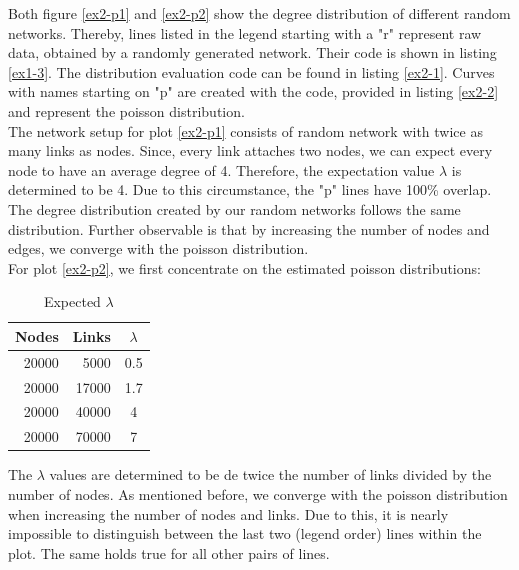 \documentclass[10pt,a4paper]{article}
\begin{document}
\begin{enumerate}
Both figure \ref{ex2-p1} and \ref{ex2-p2} show the degree distribution of different random networks. Thereby, lines listed in the legend starting with a {"}r{"} represent raw data, obtained by a randomly generated network. Their code is shown in listing \ref{ex1-3}. The distribution evaluation code can be found in listing \ref{ex2-1}. Curves with names starting on {"}p{"} are created with the code, provided in listing \ref{ex2-2} and represent the poisson distribution.\\
The network setup for plot \ref{ex2-p1} consists of random network with twice as many links as nodes. Since, every link attaches two nodes, we can expect every node to have an average degree of 4. Therefore, the expectation value $\lambda$ is determined to be 4. Due to this circumstance, the {"}p{"} lines have 100{\%} overlap. The degree distribution created by our random networks follows the same distribution. Further observable is that by increasing the number of nodes and edges, we converge with the poisson distribution.\\
For plot \ref{ex2-p2}, we first concentrate on the estimated poisson distributions:\\
\begin{table}
	\caption{Expected $\lambda$}
	\label{ex2-lambda}
	\begin{tabular}{|r|r|c|}
	\hline 
	Nodes & Links & $\lambda$\\
	\hline \hline
	20000 & 5000 & 0.5\\
	\hline
	20000 & 17000 & 1.7\\
	\hline
	20000 & 40000 & 4\\
	\hline
	20000 & 70000 & 7\\
	\hline
	\end{tabular}
	\newline
The $\lambda$ values are determined to be de twice the number of links divided by the number of nodes. As mentioned before, we converge with the poisson distribution when increasing the number of nodes and links. Due to this, it is nearly impossible to distinguish between the last two (legend order) lines within the plot. The same holds true for all other pairs of lines.
\end{table}



\end{enumerate}
\end{document}

